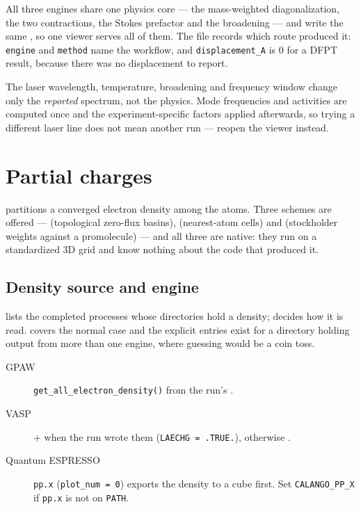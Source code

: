 All three engines share one physics core --- the mass-weighted
diagonalization, the two contractions, the Stokes prefactor and the broadening
--- and write the same , so one viewer serves all of them.
The file records which route produced it: \texttt{engine} and \texttt{method}
name the workflow, and \texttt{displacement\_A} is $0$ for a DFPT result,
because there was no displacement to report.

\begin{calnote}
The laser wavelength, temperature, broadening and frequency window change only
the \emph{reported} spectrum, not the physics. Mode frequencies and activities
are computed once and the experiment-specific factors applied afterwards, so
trying a different laser line does not mean another run --- reopen the viewer
instead.
\end{calnote}

\section{Partial charges}
\label{sec:partial-charges}

\menusep{} partitions a
converged electron density among the atoms. Three schemes are offered ---
 (topological zero-flux basins),  (nearest-atom cells)
and  (stockholder weights against a promolecule) --- and all
three are native: they run on a standardized 3D grid and know nothing about
the code that produced it.

\subsection{Density source and engine}

 lists the completed processes whose directories
hold a density;  decides how it is read. 
covers the normal case and the explicit entries exist for a directory holding
output from more than one engine, where guessing would be a coin toss.

\begin{description}
  \item[GPAW] \texttt{get\_all\_electron\_density()} from the run's
    .
  \item[VASP]  +  when the run wrote them
    (\texttt{LAECHG = .TRUE.}), otherwise .
  \item[Quantum ESPRESSO] \texttt{pp.x} (\texttt{plot\_num = 0}) exports the
    density to a cube first. Set \texttt{CALANGO\_PP\_X} if \texttt{pp.x} is
    not on \texttt{PATH}.
\end{description}

